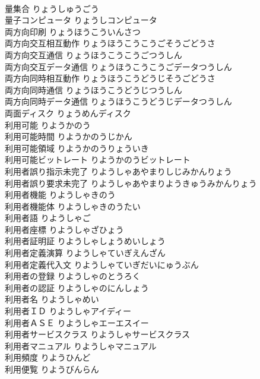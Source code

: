 \documentclass[8pt]{extreport}
\begin{document}
\begin{CJK}{UTF8}{min}
\\	量集合	りょうしゅうごう	
\\	量子コンピュータ	りょうしコンピュータ	
\\	両方向印刷	りょうほうこういんさつ	
\\	両方向交互相互動作	りょうほうこうこうごそうごどうさ	
\\	両方向交互通信	りょうほうこうこうごつうしん	
\\	両方向交互データ通信	りょうほうこうこうごデータつうしん	
\\	両方向同時相互動作	りょうほうこうどうじそうごどうさ	
\\	両方向同時通信	りょうほうこうどうじつうしん	
\\	両方向同時データ通信	りょうほうこうどうじデータつうしん	
\\	両面ディスク	りょうめんディスク	
\\	利用可能	りようかのう	
\\	利用可能時間	りようかのうじかん	
\\	利用可能領域	りようかのうりょういき	
\\	利用可能ビットレート	りようかのうビットレート	
\\	利用者誤り指示未完了	りようしゃあやまりしじみかんりょう	
\\	利用者誤り要求未完了	りようしゃあやまりようきゅうみかんりょう	
\\	利用者機能	りようしゃきのう	
\\	利用者機能体	りようしゃきのうたい	
\\	利用者語	りようしゃご	
\\	利用者座標	りようしゃざひょう	
\\	利用者証明証	りようしゃしょうめいしょう	
\\	利用者定義演算	りようしゃていぎえんざん	
\\	利用者定義代入文	りようしゃていぎだいにゅうぶん	
\\	利用者の登録	りようしゃのとうろく	
\\	利用者の認証	りようしゃのにんしょう	
\\	利用者名	りようしゃめい	
\\	利用者ＩＤ	りようしゃアイディー	
\\	利用者ＡＳＥ	りようしゃエーエスイー	
\\	利用者サービスクラス	りようしゃサービスクラス	
\\	利用者マニュアル	りようしゃマニュアル	
\\	利用頻度	りようひんど	
\\	利用便覧	りようびんらん	

\end{CJK}
\end{document}
